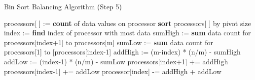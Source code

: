 \begin{algorithm}
\caption{Bin Sort Balancing Algorithm (Step 5)}
\label{binsortbalance}
\begin{algorithmic}[1]
\STATE processors[ ] := \textbf{count} of data values on processor
\STATE \textbf{sort} processors[ ] by pivot size
  \STATE index := \textbf{find} index of processor with most data
  \STATE sumHigh := \textbf{sum} data count for processors[index+1] to processors[m]
  \STATE sumLow := \textbf{sum} data count for processors[1] to [processors[index-1]
  \STATE addHigh := (m-index) * (n/m) - sumHigh
  \STATE addLow := (index-1) * (n/m) - sumLow
  \STATE processors[index+1] += addHigh
  \STATE processors[index-1] += addLow
  \STATE processor[index] -= addHigh + addLow
\ENDFOR
\end{algorithmic}
\end{algorithm}
